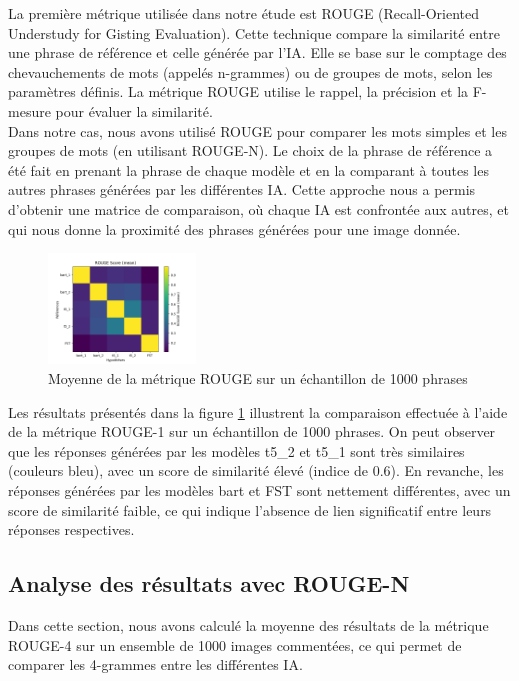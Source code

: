 \documentclass[conference]{IEEEtran}
\begin{document}
La première métrique utilisée dans notre étude est ROUGE (Recall-Oriented Understudy for Gisting Evaluation). Cette technique compare la similarité entre une phrase de référence et celle générée par l'IA. Elle se base sur le comptage des chevauchements de mots (appelés n-grammes) ou de groupes de mots, selon les paramètres définis. La métrique ROUGE utilise le rappel, la précision et la F-mesure pour évaluer la similarité.\\

Dans notre cas, nous avons utilisé ROUGE pour comparer les mots simples et les groupes de mots (en utilisant ROUGE-N). Le choix de la phrase de référence a été fait en prenant la phrase de chaque modèle et en la comparant à toutes les autres phrases générées par les différentes IA. Cette approche nous a permis d'obtenir une matrice de comparaison, où chaque IA est confrontée aux autres, et qui nous donne la proximité des phrases générées pour une image donnée.

\begin{figure}[ht!]
\centering
\includegraphics[width=0.35\textwidth]{images/rouge_score_mean_1000.png}
\caption{Moyenne de la métrique ROUGE sur un échantillon de 1000 phrases}
\label{fig}
\end{figure}

Les résultats présentés dans la figure \ref{fig} illustrent la comparaison effectuée à l'aide de la métrique ROUGE-1 sur un échantillon de 1000 phrases. On peut observer que les réponses générées par les modèles t5\_2 et t5\_1 sont très similaires (couleurs bleu), avec un score de similarité élevé (indice de 0.6). En revanche, les réponses générées par les modèles bart et FST sont nettement différentes, avec un score de similarité faible, ce qui indique l'absence de lien significatif entre leurs réponses respectives.

\subsection{Analyse des résultats avec ROUGE-N}

Dans cette section, nous avons calculé la moyenne des résultats de la métrique ROUGE-4 sur un ensemble de 1000 images commentées, ce qui permet de comparer les 4-grammes entre les différentes IA.
\end{document}
